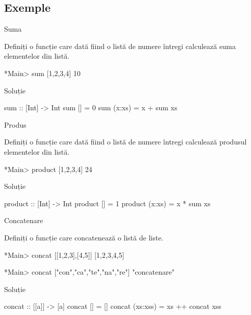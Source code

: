 \documentclass[xcolor=pdftex,romanian,colorlinks]{beamer}
\begin{document}
\subsection{Exemple}
\begin{frame}[fragile]{Suma}
\begin{block}{}
Definiți o funcție care dată fiind o listă de numere întregi calculează suma elementelor din listă.
\begin{asciihs}
*Main> sum [1,2,3,4]
10
\end{asciihs}
\end{block}
\begin{block}{Soluție }
\begin{asciihs}
sum :: [Int] -> Int
sum []     = 0
sum (x:xs) = x + sum xs
\end{asciihs}
\end{block}
\end{frame}


\begin{frame}[fragile]{Produs}
\begin{block}{}
Definiți o funcție care dată fiind o listă de numere întregi calculează produsul elementelor din listă.
\begin{asciihs}
*Main> product [1,2,3,4]
24
\end{asciihs}
\end{block}
\begin{block}{Soluție }
\begin{asciihs}
product :: [Int] -> Int
product []     = 1
product (x:xs) = x * sum xs
\end{asciihs}
\end{block}
\end{frame}

\begin{frame}[fragile]{Concatenare}
\begin{block}{}
Definiți o funcție care concatenează o listă de liste.
\begin{asciihs}
*Main> concat [[1,2,3],[4,5]]
[1,2,3,4,5]

*Main> concat ["con","ca","te","na","re"]
"concatenare"
\end{asciihs}
\end{block}
\begin{block}{Soluție }
\begin{asciihs}
concat :: [[a]] -> [a]
concat []       = []
concat (xs:xss) = xs ++ concat xss
\end{asciihs}
\end{block}
\end{frame}
\end{document}
